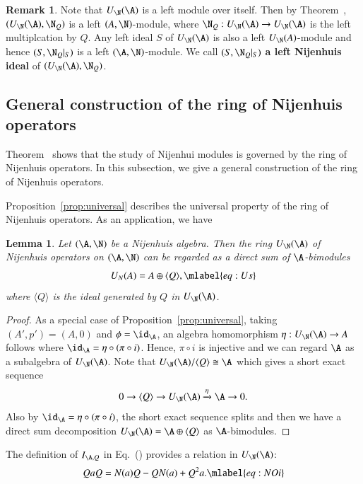 \documentclass[12pt]{amsart}
\newtheorem{lemma}[theorem]{Lemma}
\theoremstyle{definition}
\newtheorem{remark}[theorem]{Remark}
\begin{document}
\begin{remark}
Note that $U_{\N}(\A)$ is a left module over itself. Then by Theorem~, $(U_{\N}(\A), \N_Q)$ is a left $(A,\N)$-module, where $\N_Q: U_{\N}(\A) \to U_{\N}(\A)$ is the left multiplcation by $Q$. Any left ideal $S$ of $U_{\N}(\A)$ is also a left $U_{\N}(A)$-module and hence $(S, \N_Q|_S)$ is a left $(\A,\N)$-module. We call $(S, \N_Q|_S)$ {\bf a left Nijenhuis ideal} of $(U_{\N}(\A), \N_Q)$.  
\end{remark}


\subsection{General construction of the ring of Nijenhuis operators}

Theorem~ shows that the study of Nijenhui modules is governed by the ring of Nijenhuis operators. In this subsection, we give a general construction of the ring of Nijenhuis operators.


Proposition~\ref{prop:universal} describes the universal property of the ring of Nijenhuis operators. As an application, we have
\begin{lemma}
Let $(\A,\N)$ be a  Nijenhuis algebra. Then the ring $U_\N(\A)$ of Nijenhuis operators on $(\A,\N)$  can be regarded as a direct sum of $\A$-bimodules 
\begin{equation}
U_N(A)=A\oplus \langle Q\rangle, 
\mlabel{eq:Us}
\end{equation} 
where $\langle Q \rangle$ is the ideal generated by $Q$ in $U_{\N}(\A)$. 
\end{lemma}
%
\begin{proof}
As a special case of Proposition~\ref{prop:universal},
taking $(A',p')=(A,0)$ and $\phi=\id_\A $, an algebra homomorphism $\eta: U_{\N}(\A)\rightarrow A$ follows where $ \id_\A=\eta\circ (\pi \circ i)$.  Hence, $\pi \circ i$ is injective and we can regard $\A$ as a subalgebra of $U_{\N}(\A)$. Note that $U_{\N}(\A) / \langle Q \rangle \cong \A$ which gives a short exact sequence $$0\rightarrow \langle Q \rangle\rightarrow U_{\N}(\A)\xrightarrow{\eta} \A\rightarrow 0.$$ Also by $ \id_\A=\eta\circ (\pi \circ i)$, the  short exact sequence splits and then we have a direct sum decomposition $U_{\N}(\A) = \A \oplus \langle Q \rangle$ as $\A$-bimodules.     
\end{proof}
 
 
The definition of $I_{\A,Q}$ in Eq.~() provides a relation in $U_\N(\A)$: 
\begin{equation}
QaQ =N(a)Q-QN(a) +Q^2a.  
\mlabel{eq:NOi}
\end{equation} 
\end{document}
